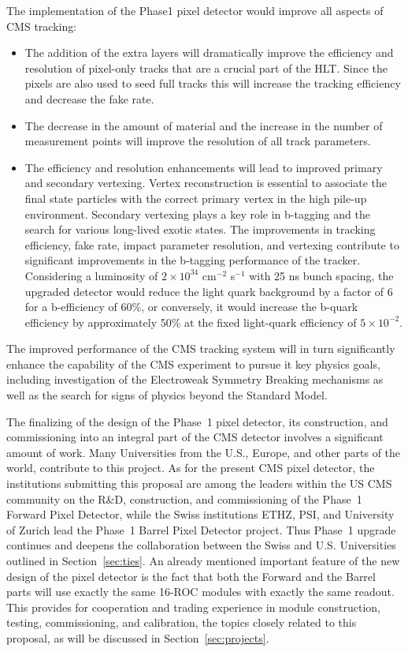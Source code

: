 The implementation of the Phase1 pixel detector would improve all aspects of CMS tracking:
\begin{itemize}
\item The addition of the extra layers will dramatically improve the
  efficiency and resolution of pixel-only tracks that are a crucial
  part of the HLT. Since the pixels are also used to seed full tracks
  this will increase the tracking efficiency and decrease the fake
  rate.
\item The decrease in the amount of material and the increase in the
  number of measurement points will improve the resolution of all
  track parameters.
\item The efficiency and resolution enhancements will lead to improved
  primary and secondary vertexing. Vertex reconstruction is essential
  to associate the final state particles with the correct primary
  vertex in the high pile-up environment. Secondary vertexing plays a
  key role in b-tagging and the search for various long-lived exotic
  states. The improvements in tracking efficiency, fake rate, impact
  parameter resolution, and vertexing contribute to significant
  improvements in the b-tagging performance of the tracker.
  Considering a luminosity of $2 \times 10^{34}$ cm$^{-2}$ s$^{-1}$
  with 25 ns bunch spacing, the upgraded detector would reduce the
  light quark background by a factor of 6 for a b-efficiency of 60\%,
  or conversely, it would increase the b-quark efficiency by
  approximately 50\% at the fixed light-quark efficiency of $5\times
  10^{-2}$.
\end{itemize}

\noindent
The improved performance of the CMS tracking system will in turn
significantly enhance the capability of the CMS experiment to pursue
it key physics goals, including investigation of the Electroweak
Symmetry Breaking mechanisms as well as the search for signs of
physics beyond the Standard Model.

The finalizing of the design of the Phase~1 pixel detector, its
construction, and commissioning into an integral part of the CMS
detector involves a significant amount of work. Many Universities from
the U.S., Europe, and other parts of the world, contribute to this
project. As for the present CMS pixel detector, the institutions
submitting this proposal are among the leaders within the US CMS
community on the R\&D, construction, and commissioning of the Phase~1
Forward Pixel Detector, while the Swiss institutions ETHZ, PSI, and
University of Zurich lead the Phase~1 Barrel Pixel Detector project.
Thus Phase~1 upgrade continues and deepens the collaboration between
the Swiss and U.S. Universities outlined in Section~\ref{sec:ties}.
An already mentioned important feature of the new design of the pixel
detector is the fact that both the Forward and the Barrel parts will
use exactly the same 16-ROC modules with exactly the same readout.
This provides for cooperation and trading experience in module
construction, testing, commissioning, and calibration, the topics
closely related to this proposal, as will be discussed in
Section~\ref{sec:projects}.


